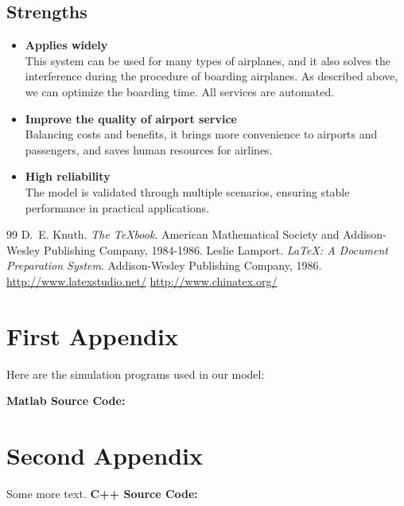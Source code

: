 \documentclass{mcmthesis}
\begin{document}
\subsection{Strengths}
\begin{itemize}
\item \textbf{Applies widely}\\
This system can be used for many types of airplanes, and it also solves the interference during the procedure of boarding airplanes. As described above, we can optimize the boarding time. All services are automated.
\item \textbf{Improve the quality of airport service}\\
Balancing costs and benefits, it brings more convenience to airports and passengers, and saves human resources for airlines.
\item \textbf{High reliability}\\
The model is validated through multiple scenarios, ensuring stable performance in practical applications.
\end{itemize}

\begin{thebibliography}{99}
 D.~E. Knuth. \textit{The \TeX{}book}. American Mathematical Society and Addison-Wesley Publishing Company, 1984-1986.
 Leslie Lamport. \textit{\LaTeX{}: A Document Preparation System}. Addison-Wesley Publishing Company, 1986.
 \url{http://www.latexstudio.net/}
 \url{http://www.chinatex.org/}
\end{thebibliography}

\begin{appendices}
\section{First Appendix}
\lipsum[13]
Here are the simulation programs used in our model:

\textbf{\textcolor[rgb]{0.98,0.00,0.00}{Matlab Source Code:}}
% 

\section{Second Appendix}
Some more text. \textbf{\textcolor[rgb]{0.98,0.00,0.00}{C++ Source Code:}}
% 

\end{appendices}
\end{document}
